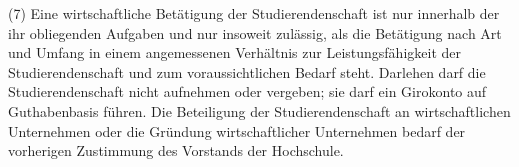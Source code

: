 \documentclass[
10pt,
a4paper,
twoside,								%
titlepage=false,							%
draft=false								%
]{scrartcl}
\begin{document}
(7) Eine wirtschaftliche Betätigung der Studierendenschaft ist nur innerhalb der ihr obliegenden Aufgaben und nur insoweit zulässig, als die Betätigung nach Art und Umfang in einem angemessenen Verhältnis zur Leistungsfähigkeit der Studierendenschaft und zum voraussichtlichen Bedarf steht. Darlehen darf die Studierendenschaft nicht aufnehmen oder vergeben; sie darf ein Girokonto auf Guthabenbasis führen. Die Beteiligung der Studierendenschaft an wirtschaftlichen Unternehmen oder die Gründung wirtschaftlicher Unternehmen bedarf der vorherigen Zustimmung des Vorstands der Hochschule.



\end{document}
